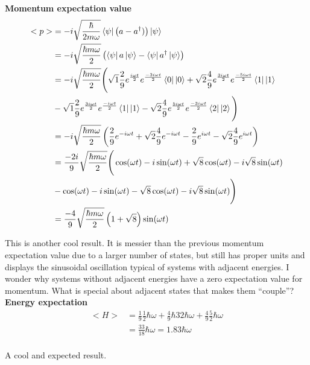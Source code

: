 \documentclass[10pt]{article} %
\begin{document}
\textbf{Momentum expectation value}
\begin{align*}
  <p> &= -i\sqrt{\frac{\hbar}{2m\omega}}\bra{\psi}\left(a - a^\dagger)\right)\ket{\psi}\\
  &= -i\sqrt{\frac{\hbar m\omega}{2}}\left(\bra{\psi}a\ket{\psi}
  - \bra{\psi}a^\dagger\ket{\psi}\right)\\
  &= -i\sqrt{\frac{\hbar m\omega}{2}}
  \Bigg(
  \sqrt{1}\frac{2}{9}e^{\frac{i\omega t}{2}}e^{\frac{-3i\omega t}{2}}\bra{0}\ket{0}
  + \sqrt{2}\frac{4}{9}e^{\frac{3i\omega t}{2}}e^{\frac{-5i\omega t}{2}}\bra{1}\ket{1}\\
  &-\sqrt{1}\frac{2}{9}e^{\frac{3i\omega t}{2}}e^{\frac{-i\omega t}{2}}\bra{1}\ket{1}
  - \sqrt{2}\frac{4}{9}e^{\frac{5i\omega t}{2}}e^{\frac{-3i\omega t}{2}}\bra{2}\ket{2}
  \Bigg)\\
  &= -i\sqrt{\frac{\hbar m\omega}{2}}
  \left(\frac{2}{9}e^{-i\omega t} + \sqrt{2}\frac{4}{9}e^{-i\omega t}
  - \frac{2}{9}e^{i\omega t} - \sqrt{2}\frac{4}{9}e^{i\omega t}\right)\\
  &= \frac{-2i}{9}\sqrt{\frac{\hbar m\omega}{2}}
  \Bigg(
  \cos(\omega t) - i\sin(\omega t)
  + \sqrt{8}\cos(\omega t) - i\sqrt{8}\sin(\omega t)\\
  &- \cos(\omega t) - i\sin(\omega t)
  - \sqrt{8}\cos(\omega t) - i\sqrt{8}\sin(\omega t)
  \Bigg)\\
  &= \frac{-4}{9}\sqrt{\frac{\hbar m\omega}{2}}\left(1 + \sqrt{8}\right)\sin(\omega t)\\
\end{align*}

This is another cool result. It is messier than the previous momentum expectation value due to
a larger number of states, but still has proper units and displays the sinusoidal oscillation
typical of systems with adjacent energies. I wonder why systems without adjacent energies have a
zero expectation value for momentum. What is special about adjacent states that makes them
``couple''?\\

\textbf{Energy expectation}
\begin{align*}
  <H> &= \frac{1}{9}\frac{1}{2}\hbar\omega + \frac{4}{9}\hbar{3}{2}\hbar\omega
  + \frac{4}{9}\frac{5}{2}\hbar\omega\\
  &= \frac{33}{18}\hbar\omega = 1.83\hbar\omega\\
\end{align*}

A cool and expected result.\\
\end{document}

